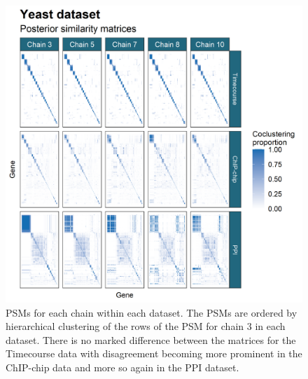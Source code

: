 \documentclass[]{article}
\begin{document}
\begin{figure}
	\centering
	\includegraphics[scale=1.0]{./Images/Yeast/YeastPSMcomparisonReduced.png}
	\caption{PSMs for each chain within each dataset. The PSMs are ordered by hierarchical clustering of the rows of the PSM for chain 3 in each dataset. There is no marked difference between the matrices for the Timecourse data with disagreement becoming more prominent in the ChIP-chip data and more so again in the PPI dataset.}
	\label{fig:yeastPSMs}
\end{figure}



\end{document}
